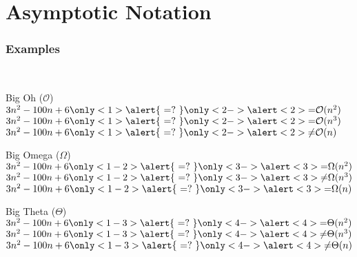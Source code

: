 \documentclass[aspectratio=169]{beamer}
\begin{document}
\section{Asymptotic Notation}


\begin{frame}[t]\frametitle{Examples}
    ~\\[-8mm]
    \begin{block}{Big Oh ($\mathcal{O}$)}
        $3n^2 -100n+6 \only<1>{\alert{~{=}?~}}\only<2->{\alert<2>{=   }} \mathcal{O}(n^2)$
      \\$3n^2 -100n+6 \only<1>{\alert{~{=}?~}}\only<2->{\alert<2>{=   }} \mathcal{O}(n^3)$
      \\$3n^2 -100n+6 \only<1>{\alert{~{=}?~}}\only<2->{\alert<2>{\neq}} \mathcal{O}(n)$  
    \end{block}

    \begin{block}{Big Omega ($\Omega$)}
        $3n^2 -100n+6 \only<1-2>{\alert{~{=}?~}}\only<3->{\alert<3>{=   }} \Omega(n^2)$
      \\$3n^2 -100n+6 \only<1-2>{\alert{~{=}?~}}\only<3->{\alert<3>{\neq}} \Omega(n^3)$
      \\$3n^2 -100n+6 \only<1-2>{\alert{~{=}?~}}\only<3->{\alert<3>{=   }} \Omega(n)$  
    \end{block}

    \begin{block}{Big Theta ($\Theta$)}
        $3n^2 - 100n + 6 \only<1-3>{\alert{~{=}?~}}\only<4->{\alert<4>{=   }} \Theta(n^2)$
      \\$3n^2 - 100n + 6 \only<1-3>{\alert{~{=}?~}}\only<4->{\alert<4>{\neq}} \Theta(n^3)$
      \\$3n^2 - 100n + 6 \only<1-3>{\alert{~{=}?~}}\only<4->{\alert<4>{\neq}} \Theta(n)$  
    \end{block}

\end{frame}
\end{document}
